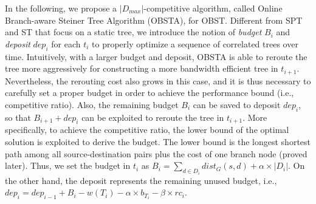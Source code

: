 \documentclass[10pt, conference, letterpaper]{IEEEtran}
\theoremstyle{definition}
\begin{document}
In the following, we propose a $|D_{max}|$-competitive algorithm, called Online Branch-aware Steiner Tree Algorithm (OBSTA), for OBST. Different from SPT and ST that focus on a static tree, we introduce the notion of \emph{budget} $B_{i}$ and \emph{deposit} $dep_{i}$ for each $t_i$ to properly optimize a sequence of correlated trees over time. Intuitively, with a larger budget and deposit, OBSTA is able to reroute the tree more aggressively for constructing a more bandwidth efficient tree in $t_{i+1}$. Nevertheless, the rerouting cost also grows in this case, and it is thus necessary to carefully set a proper budget in order to achieve the performance bound (i.e., competitive ratio). Also, the remaining budget $B_{i}$ can be saved to deposit $dep_{i}$, so that $B_{i+1}+dep_{i}$ can be exploited to reroute the tree in $t_{i+1}$. More specifically, to achieve the competitive ratio, the lower bound of the optimal solution is exploited to derive the budget. The lower bound is the longest shortest path among all source-destination pairs plus the cost of one branch node (proved later). Thus, we set the budget in $t_i$ as $B_{i} = \sum_{d\in D_{i}}dist_{G}(s,d)+\alpha\times |D_{i}|$. On the other hand, the deposit represents the remaining unused budget, i.e., $dep_{i}=dep_{i-1}+B_{i}-w(T_{i})-\alpha\times b_{T_i}-\beta \times rc_{i}$. 
\end{document}
